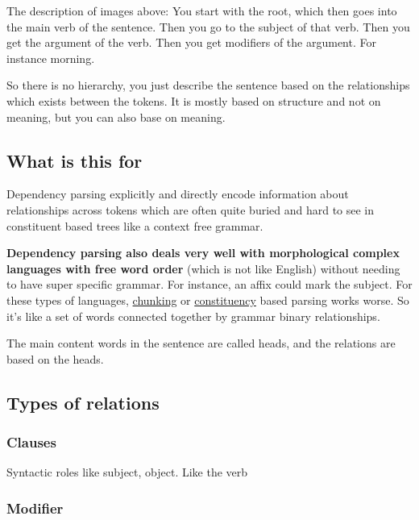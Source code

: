 \documentclass[
  11pt,
  british,
]{article}
\begin{document}
The description of images above: You start with the root, which then
goes into the main verb of the sentence. Then you go to the subject of
that verb. Then you get the argument of the verb. Then you get modifiers
of the argument. For instance morning.

So there is no hierarchy, you just describe the sentence based on the
relationships which exists between the tokens. It is mostly based on
structure and not on meaning, but you can also base on meaning.

\hypertarget{what-is-this-for}{%
\subsection{What is this for}\label{what-is-this-for}}

Dependency parsing explicitly and directly encode information about
relationships across tokens which are often quite buried and hard to see
in constituent based trees like a context free grammar.

\textbf{Dependency parsing also deals very well with morphological
complex languages with free word order} (which is not like English)
without needing to have super specific grammar. For instance, an affix
could mark the subject. For these types of languages,
\href{Chunking.md}{chunking} or \href{Constituency.md}{constituency}
based parsing works worse. So it's like a set of words connected
together by grammar binary relationships.

The main content words in the sentence are called heads, and the
relations are based on the heads.

\hypertarget{types-of-relations}{%
\subsection{Types of relations}\label{types-of-relations}}

\hypertarget{clauses}{%
\subsubsection{Clauses}\label{clauses}}

Syntactic roles like subject, object. Like the verb

\hypertarget{modifier}{%
\subsubsection{Modifier}\label{modifier}}
\end{document}
